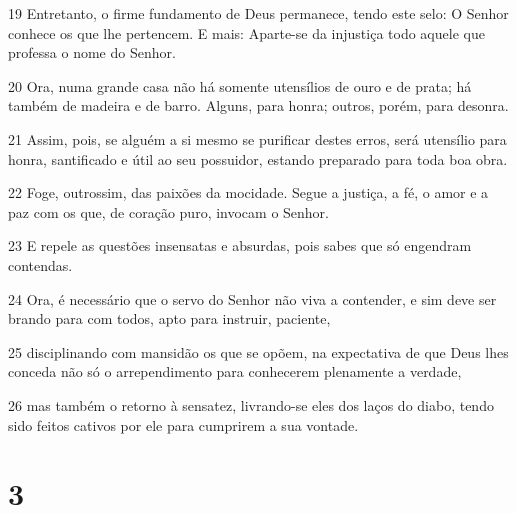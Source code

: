 \par 19 Entretanto, o firme fundamento de Deus permanece, tendo este selo: O Senhor conhece os que lhe pertencem. E mais: Aparte-se da injustiça todo aquele que professa o nome do Senhor.
\par 20 Ora, numa grande casa não há somente utensílios de ouro e de prata; há também de madeira e de barro. Alguns, para honra; outros, porém, para desonra.
\par 21 Assim, pois, se alguém a si mesmo se purificar destes erros, será utensílio para honra, santificado e útil ao seu possuidor, estando preparado para toda boa obra.
\par 22 Foge, outrossim, das paixões da mocidade. Segue a justiça, a fé, o amor e a paz com os que, de coração puro, invocam o Senhor.
\par 23 E repele as questões insensatas e absurdas, pois sabes que só engendram contendas.
\par 24 Ora, é necessário que o servo do Senhor não viva a contender, e sim deve ser brando para com todos, apto para instruir, paciente,
\par 25 disciplinando com mansidão os que se opõem, na expectativa de que Deus lhes conceda não só o arrependimento para conhecerem plenamente a verdade,
\par 26 mas também o retorno à sensatez, livrando-se eles dos laços do diabo, tendo sido feitos cativos por ele para cumprirem a sua vontade.

\chapter{3}

